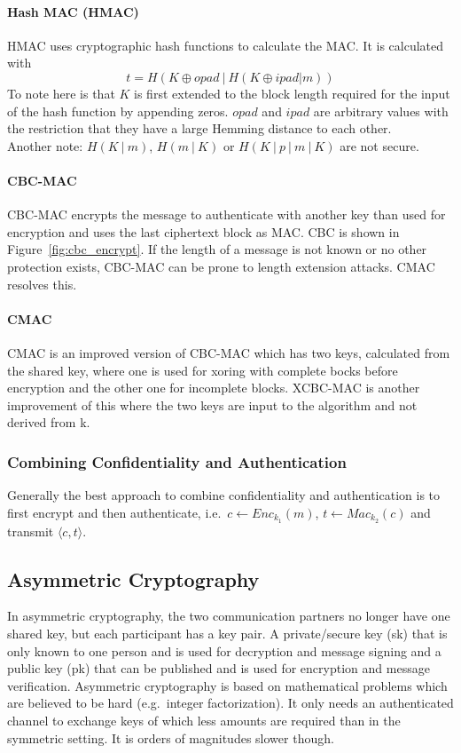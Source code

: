 \paragraph{Hash MAC (HMAC)}
HMAC uses cryptographic hash functions to calculate the MAC\@.
It is calculated with
\begin{equation*}
  t = H(K \oplus opad~|~H(K \oplus ipad | m))
\end{equation*}
To note here is that $K$ is first extended to the block length required for the input of the hash function by appending zeros.
$opad$ and $ipad$ are arbitrary values with the restriction that they have a large Hemming distance to each other.\\
Another note: $H(K~|~m)$, $H(m~|~K)$ or $H(K~|~p~|~m~|~K)$ are not secure.

\paragraph{CBC-MAC}
CBC-MAC encrypts the message to authenticate with another key than used for encryption and uses the last ciphertext block as MAC\@.
CBC is shown in Figure~\ref{fig:cbc_encrypt}.
If the length of a message is not known or no other protection exists, CBC-MAC can be prone to length extension attacks.
CMAC resolves this.

\paragraph{CMAC}
CMAC is an improved version of CBC-MAC which has two keys, calculated from the shared key, where one is used for xoring with complete bocks before encryption and the other one for incomplete blocks.
XCBC-MAC is another improvement of this where the two keys are input to the algorithm and not derived from k.

\subsubsection{Combining Confidentiality and Authentication}
Generally the best approach to combine confidentiality and authentication is to first encrypt and then authenticate, i.e.\ $c \leftarrow Enc_{k_1}(m)$, $t \leftarrow Mac_{k_2}(c)$ and transmit $\langle c,t \rangle$.

\subsection{Asymmetric Cryptography}
In asymmetric cryptography, the two communication partners no longer have one shared key, but each participant has a key pair.
A private/secure key (sk) that is only known to one person and is used for decryption and message signing and a public key (pk) that can be published and is used for encryption and message verification.
Asymmetric cryptography is based on mathematical problems which are believed to be hard (e.g.\ integer factorization).
It only needs an authenticated channel to exchange keys of which less amounts are required than in the symmetric setting.
It is orders of magnitudes slower though.

